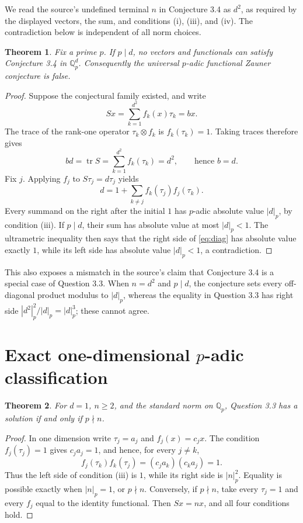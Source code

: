 \documentclass[11pt]{article}
\newtheorem{theorem}{Theorem}
\newcommand{\Qp}{\mathbb Q_p}
\begin{document}
We read the source's undefined terminal \(n\) in Conjecture 3.4 as \(d^2\),
as required by the displayed vectors, the sum, and conditions (i), (iii), and
(iv).  The contradiction below is independent of all norm choices.

\begin{theorem}\label{thm:padic}
Fix a prime \(p\).  If \(p\mid d\), no vectors and functionals can satisfy
Conjecture 3.4 in \(\Qp^d\).  Consequently the universal \(p\)-adic
functional Zauner conjecture is false.
\end{theorem}

\begin{proof}
Suppose the conjectural family existed, and write
\[
 Sx=\sum_{k=1}^{d^2}f_k(x)\tau_k=bx.
\]
The trace of the rank-one operator \(\tau_k\otimes f_k\) is
\(f_k(\tau_k)=1\).  Taking traces therefore gives
\[
 bd=\operatorname{tr}S=\sum_{k=1}^{d^2}f_k(\tau_k)=d^2,
 \qquad\text{hence }b=d.
\]
Fix \(j\).  Applying \(f_j\) to \(S\tau_j=d\tau_j\) yields
\begin{equation}\label{eq:diag}
 d=1+\sum_{k\ne j}f_k(\tau_j)f_j(\tau_k).
\end{equation}
Every summand on the right after the initial \(1\) has \(p\)-adic absolute
value \(|d|_p\), by condition (iii).  If \(p\mid d\), their sum has absolute
value at most \(|d|_p<1\).  The ultrametric inequality then says that the
right side of \eqref{eq:diag} has absolute value exactly \(1\), while its
left side has absolute value \(|d|_p<1\), a contradiction.
\end{proof}

This also exposes a mismatch in the source's claim that Conjecture 3.4 is a
special case of Question 3.3.  When \(n=d^2\) and \(p\mid d\), the conjecture
sets every off-diagonal product modulus to \(|d|_p\), whereas the equality in
Question 3.3 has right side
\(|d^2|_p^2/|d|_p=|d|_p^3\); these cannot agree.

\section*{Exact one-dimensional \(p\)-adic classification}

\begin{theorem}\label{thm:oned}
For \(d=1\), \(n\geq2\), and the standard norm on \(\Qp\), Question 3.3 has
a solution if and only if \(p\nmid n\).
\end{theorem}

\begin{proof}
In one dimension write \(\tau_j=a_j\) and \(f_j(x)=c_jx\).  The condition
\(f_j(\tau_j)=1\) gives \(c_ja_j=1\), and hence, for every \(j\ne k\),
\[
 f_j(\tau_k)f_k(\tau_j)
 =(c_ja_k)(c_ka_j)=1.
\]
Thus the left side of condition (iii) is \(1\), while its right side is
\(|n|_p^2\).  Equality is possible exactly when \(|n|_p=1\), or
\(p\nmid n\).  Conversely, if \(p\nmid n\), take every \(\tau_j=1\) and
every \(f_j\) equal to the identity functional.  Then
\(Sx=nx\), and all four conditions hold.
\end{proof}
\end{document}
